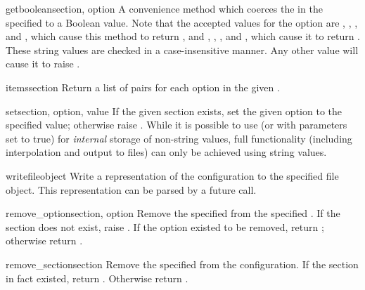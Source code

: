 \begin{methoddesc}{getboolean}{section, option}
A convenience method which coerces the  in the specified
 to a Boolean value.  Note that the accepted values
for the option are , , , and ,
which cause this method to return , and , ,
, and , which cause it to return .  These
string values are checked in a case-insensitive manner.  Any other value will
cause it to raise .
\end{methoddesc}

\begin{methoddesc}{items}{section}
Return a list of  pairs for each
option in the given .
\end{methoddesc}

\begin{methoddesc}{set}{section, option, value}
If the given section exists, set the given option to the specified
value; otherwise raise .  While it is
possible to use  (or  with
 parameters set to true) for \emph{internal} storage of
non-string values, full functionality (including interpolation and
output to files) can only be achieved using string values.
\end{methoddesc}

\begin{methoddesc}{write}{fileobject}
Write a representation of the configuration to the specified file
object.  This representation can be parsed by a future 
call.
\end{methoddesc}

\begin{methoddesc}{remove_option}{section, option}
Remove the specified  from the specified .
If the section does not exist, raise . 
If the option existed to be removed, return ;
otherwise return .
\end{methoddesc}

\begin{methoddesc}{remove_section}{section}
Remove the specified  from the configuration.
If the section in fact existed, return .
Otherwise return .
\end{methoddesc}

